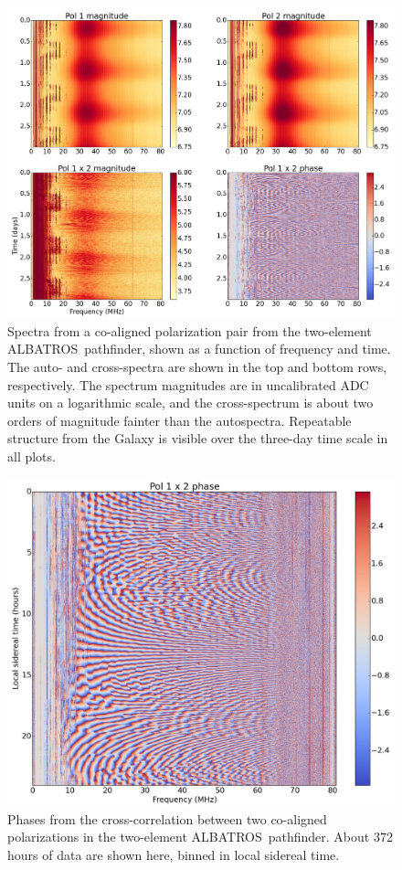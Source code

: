 \documentclass{ws-jai}
\def\albatros{ALBATROS}
\begin{document}
\begin{figure}[t]
  \begin{center}
    \includegraphics[width=\linewidth]{Figures/albatros2_waterfalls.jpg}
    \caption{Spectra from a co-aligned polarization pair from the
      two-element \albatros\ pathfinder, shown as a function of
      frequency and time.  The auto- and cross-spectra are shown in
      the top and bottom rows, respectively.  The spectrum magnitudes
      are in uncalibrated ADC units on a logarithmic scale, and the
      cross-spectrum is about two orders of magnitude fainter than the
      autospectra.  Repeatable structure from the Galaxy is visible
      over the three-day time scale in all plots.}
    \label{Fig:albatros2_waterfalls}
  \end{center}
\end{figure}

\begin{figure}[t]
  \begin{center}
    \includegraphics[width=0.8\linewidth]{Figures/albatros2_lst_phase.jpg}
    \caption{Phases from the cross-correlation between two co-aligned
      polarizations in the two-element \albatros\ pathfinder.  About
      372 hours of data are shown here, binned in local sidereal
      time.}
    \label{Fig:albatros2_phase}
  \end{center}
\end{figure}
\end{document}
